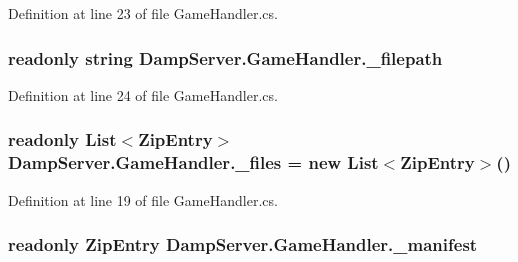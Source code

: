 Definition at line 23 of file Game\-Handler.\-cs.

\hypertarget{class_damp_server_1_1_game_handler_a0109f82d3b22ceeeb99927ee0d584794}{
\subsubsection[{\-\_\-filepath}]{\setlength{\rightskip}{0pt plus 5cm}readonly string Damp\-Server.\-Game\-Handler.\-\_\-filepath\hspace{0.3cm}{\ttfamily [private]}}}\label{class_damp_server_1_1_game_handler_a0109f82d3b22ceeeb99927ee0d584794}


Definition at line 24 of file Game\-Handler.\-cs.

\hypertarget{class_damp_server_1_1_game_handler_a8ab83176adfebd24fec732d97f703781}{
\subsubsection[{\-\_\-files}]{\setlength{\rightskip}{0pt plus 5cm}readonly List$<$Zip\-Entry$>$ Damp\-Server.\-Game\-Handler.\-\_\-files = new List$<$Zip\-Entry$>$()\hspace{0.3cm}{\ttfamily [private]}}}\label{class_damp_server_1_1_game_handler_a8ab83176adfebd24fec732d97f703781}


Definition at line 19 of file Game\-Handler.\-cs.

\hypertarget{class_damp_server_1_1_game_handler_a4840e3bce5396e408f0169f8e8b9a3f8}{
\subsubsection[{\-\_\-manifest}]{\setlength{\rightskip}{0pt plus 5cm}readonly Zip\-Entry Damp\-Server.\-Game\-Handler.\-\_\-manifest\hspace{0.3cm}{\ttfamily [private]}}}\label{class_damp_server_1_1_game_handler_a4840e3bce5396e408f0169f8e8b9a3f8}


